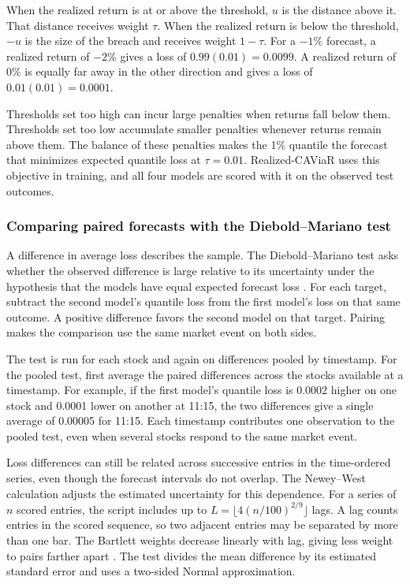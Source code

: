 \documentclass[
	12pt,				%
	openright,			%
	twoside,			%
	a4paper,
	chapter=TITLE,
	english				%
	]{abntex2}
\begin{document}
When the realized return is at or above the threshold, $u$ is the distance above it. That distance receives weight $\tau$. When the realized return is below the threshold, $-u$ is the size of the breach and receives weight $1-\tau$. For a $-1\%$ forecast, a realized return of $-2\%$ gives a loss of $0.99(0.01)=0.0099$. A realized return of 0\% is equally far away in the other direction and gives a loss of $0.01(0.01)=0.0001$.

Thresholds set too high can incur large penalties when returns fall below them. Thresholds set too low accumulate smaller penalties whenever returns remain above them. The balance of these penalties makes the 1\% quantile the forecast that minimizes expected quantile loss at $\tau=0.01$. Realized-CAViaR uses this objective in training, and all four models are scored with it on the observed test outcomes.

\subsubsection{Comparing paired forecasts with the Diebold--Mariano test}

A difference in average loss describes the sample. The Diebold--Mariano test asks whether the observed difference is large relative to its uncertainty under the hypothesis that the models have equal expected forecast loss \cite{diebold-mariano-1995}. For each target, subtract the second model's quantile loss from the first model's loss on that same outcome. A positive difference favors the second model on that target. Pairing makes the comparison use the same market event on both sides.

The test is run for each stock and again on differences pooled by timestamp. For the pooled test, first average the paired differences across the stocks available at a timestamp. For example, if the first model's quantile loss is 0.0002 higher on one stock and 0.0001 lower on another at 11:15, the two differences give a single average of 0.00005 for 11:15. Each timestamp contributes one observation to the pooled test, even when several stocks respond to the same market event.

Loss differences can still be related across successive entries in the time-ordered series, even though the forecast intervals do not overlap. The Newey--West calculation adjusts the estimated uncertainty for this dependence. For a series of $n$ scored entries, the script includes up to $L=\lfloor 4(n/100)^{2/9}\rfloor$ lags. A lag counts entries in the scored sequence, so two adjacent entries may be separated by more than one bar. The Bartlett weights decrease linearly with lag, giving less weight to pairs farther apart \cite{newey-west-1987,project-comparison}. The test divides the mean difference by its estimated standard error and uses a two-sided Normal approximation.
\end{document}
